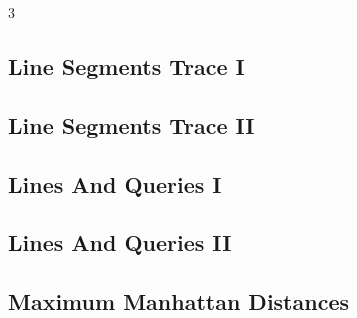 \documentclass[8pt]{extarticle}
\begin{document}
\begin{multicols*}{3}
\subsection{Line Segments Trace I}
\begin{caixaenunciado}

\end{caixaenunciado}
\vspace{0.3cm}


\subsection{Line Segments Trace II}
\begin{caixaenunciado}

\end{caixaenunciado}
\vspace{0.3cm}


\subsection{Lines And Queries I}
\begin{caixaenunciado}

\end{caixaenunciado}
\vspace{0.3cm}


\subsection{Lines And Queries II}
\begin{caixaenunciado}

\end{caixaenunciado}
\vspace{0.3cm}


\subsection{Maximum Manhattan Distances}
\begin{caixaenunciado}

\end{caixaenunciado}
\vspace{0.3cm}



\end{multicols*}
\end{document}
